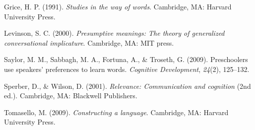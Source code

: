 \documentclass[10pt, letterpaper]{article}
\begin{document}
\hypertarget{ref-grice1991studies}{}
Grice, H. P. (1991). \emph{Studies in the way of words}. Cambridge, MA:
Harvard University Press.

\hypertarget{ref-levinson2000presumptive}{}
Levinson, S. C. (2000). \emph{Presumptive meanings: The theory of
generalized conversational implicature}. Cambridge, MA: MIT press.

\hypertarget{ref-saylor2009preschoolers}{}
Saylor, M. M., Sabbagh, M. A., Fortuna, A., \& Troseth, G. (2009).
Preschoolers use speakers' preferences to learn words. \emph{Cognitive
Development}, \emph{24}(2), 125--132.

\hypertarget{ref-sperber2001relevance}{}
Sperber, D., \& Wilson, D. (2001). \emph{Relevance: Communication and
cognition} (2nd ed.). Cambridge, MA: Blackwell Publishers.

\hypertarget{ref-tomasello2009constructing}{}
Tomasello, M. (2009). \emph{Constructing a language}. Cambridge, MA:
Harvard University Press.


\end{document}
